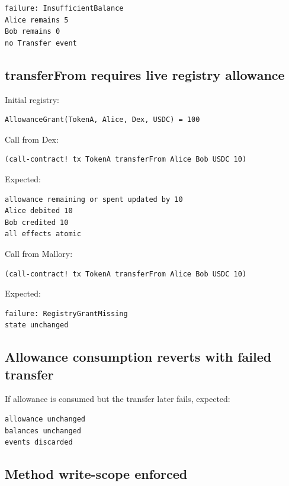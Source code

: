 \begin{lstlisting}
failure: InsufficientBalance
Alice remains 5
Bob remains 0
no Transfer event
\end{lstlisting}

\subsection{transferFrom requires live registry allowance}

Initial registry:

\begin{lstlisting}
AllowanceGrant(TokenA, Alice, Dex, USDC) = 100
\end{lstlisting}

Call from Dex:

\begin{lstlisting}
(call-contract! tx TokenA transferFrom Alice Bob USDC 10)
\end{lstlisting}

Expected:

\begin{lstlisting}
allowance remaining or spent updated by 10
Alice debited 10
Bob credited 10
all effects atomic
\end{lstlisting}

Call from Mallory:

\begin{lstlisting}
(call-contract! tx TokenA transferFrom Alice Bob USDC 10)
\end{lstlisting}

Expected:

\begin{lstlisting}
failure: RegistryGrantMissing
state unchanged
\end{lstlisting}

\subsection{Allowance consumption reverts with failed transfer}

If allowance is consumed but the transfer later fails, expected:

\begin{lstlisting}
allowance unchanged
balances unchanged
events discarded
\end{lstlisting}

\subsection{Method write-scope enforced}

